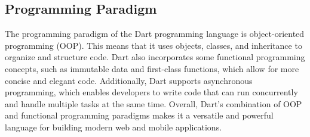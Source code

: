 \subsection{Programming Paradigm}
The programming paradigm of the Dart programming language is object-oriented programming (OOP). This means that it uses objects, classes, and inheritance to organize and structure code. Dart also incorporates some functional programming concepts, such as immutable data and first-class functions, which allow for more concise and elegant code. Additionally, Dart supports asynchronous programming, which enables developers to write code that can run concurrently and handle multiple tasks at the same time. Overall, Dart's combination of OOP and functional programming paradigms makes it a versatile and powerful language for building modern web and mobile applications.

